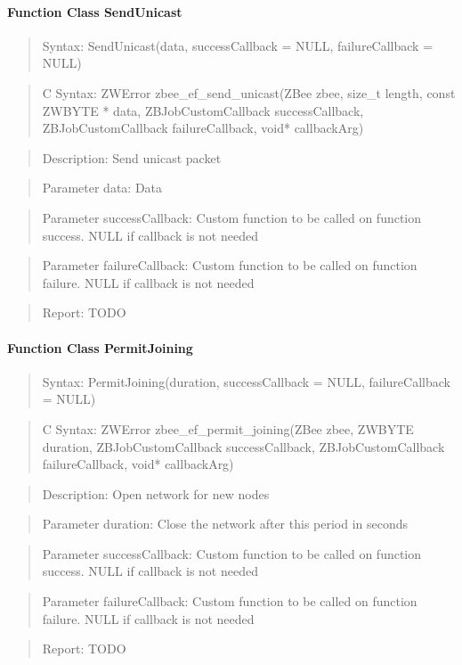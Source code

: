 \paragraph{Function Class SendUnicast}
\begin{quote}Syntax: SendUnicast(data, successCallback = NULL, failureCallback = NULL)\end{quote}
\begin{quote}C Syntax: ZWError zbee\_ef\_send\_unicast(ZBee zbee, size\_t length, const ZWBYTE * data, ZBJobCustomCallback successCallback, ZBJobCustomCallback failureCallback, void* callbackArg)\end{quote}
\begin{quote}Description: Send unicast packet\end{quote}
\begin{quote}Parameter data: Data\end{quote}
\begin{quote}Parameter successCallback: Custom function to be called on function success. NULL if callback is not needed\end{quote}
\begin{quote}Parameter failureCallback: Custom function to be called on function failure. NULL if callback is not needed\end{quote}
\begin{quote}Report: TODO\end{quote}

\paragraph{Function Class PermitJoining}
\begin{quote}Syntax: PermitJoining(duration, successCallback = NULL, failureCallback = NULL)\end{quote}
\begin{quote}C Syntax: ZWError zbee\_ef\_permit\_joining(ZBee zbee, ZWBYTE duration, ZBJobCustomCallback successCallback, ZBJobCustomCallback failureCallback, void* callbackArg)\end{quote}
\begin{quote}Description: Open network for new nodes\end{quote}
\begin{quote}Parameter duration: Close the network after this period in seconds\end{quote}
\begin{quote}Parameter successCallback: Custom function to be called on function success. NULL if callback is not needed\end{quote}
\begin{quote}Parameter failureCallback: Custom function to be called on function failure. NULL if callback is not needed\end{quote}
\begin{quote}Report: TODO\end{quote}

